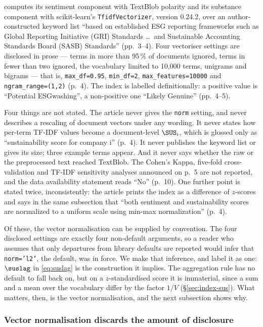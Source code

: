 \citet{lagasio2024} computes its sentiment component with TextBlob polarity
and its substance component with scikit-learn's \texttt{TfidfVectorizer},
version 0.24.2, over an author-constructed keyword list ``based on
established ESG reporting frameworks such as Global Reporting Initiative (GRI)
Standards \ldots\ and Sustainable Accounting Standards Board (SASB) Standards''
(pp.~3--4). Four vectoriser settings are disclosed in prose --- terms in more
than 95\,\% of documents ignored, terms in fewer than two ignored, the
vocabulary limited to 10{,}000 terms, unigrams and bigrams --- that is,
\texttt{max\_df=0.95}, \texttt{min\_df=2}, \texttt{max\_features=10000} and
\texttt{ngram\_range=(1,2)} (p.~4). The index is labelled definitionally: a
positive value is ``Potential ESGwashing'', a non-positive one ``Likely
Genuine'' (pp.~4--5).

Four things are not stated. The article never gives the \texttt{norm}
setting, and never describes a rescaling of document vectors under any
wording. It never states how per-term TF-IDF values become a document-level
$\SUS_i$, which is glossed only as ``sustainability score for company i''
(p.~4). It never publishes the keyword list or gives its size; three example
terms appear. And it never says whether the raw or the preprocessed text
reached TextBlob. The Cohen's Kappa, five-fold cross-validation and TF-IDF
sensitivity analyses announced on p.~5 are not reported, and the data
availability statement reads ``No'' (p.~10). One further point is stated
twice, inconsistently: the article prints the index as a difference of
$z$-scores and says in the same subsection that ``both sentiment and
sustainability scores are normalized to a uniform scale using min-max
normalization'' (p.~4).

Of these, the vector normalisation can be supplied by convention. The four
disclosed settings are exactly four non-default arguments, so a reader who
assumes that only departures from library defaults are reported would infer
that \texttt{norm='l2'}, the default, was in force. We make that inference,
and label it as one: $\suslag$ in \eqref{eq:suslag} is the construction it
implies. The aggregation rule has no default to fall back on, but on a
$z$-standardised score it is immaterial, since a sum and a mean over the
vocabulary differ by the factor $1/V$ (\S\ref{sec:index-sus}). What matters,
then, is the vector normalisation, and the next subsection shows why.

\subsubsection{Vector normalisation discards the amount of disclosure}
\label{sec:measurement}

